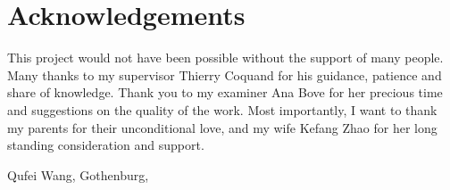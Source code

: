 \thispagestyle{plain}			%
\section*{Acknowledgements}
This project would not have been possible without the support of many people. Many thanks to my supervisor Thierry Coquand for his guidance, patience and share of knowledge. Thank you to my examiner Ana Bove for her precious time and suggestions on the quality of the work. Most importantly, I want to thank my parents for their unconditional love, and my wife Kefang Zhao for her long standing consideration and support. 

\vspace{1.5cm}
\hfill
Qufei Wang, Gothenburg, \monthname \space \the\year

\newpage				%
\thispagestyle{empty}
\mbox{}